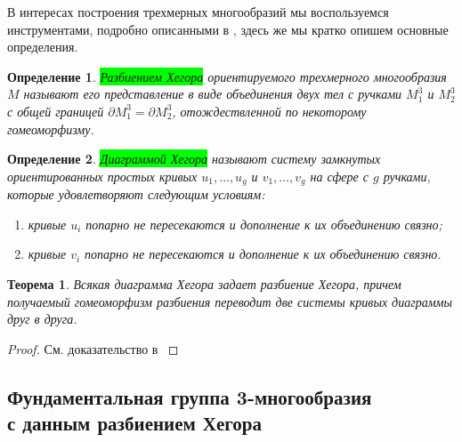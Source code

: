 \documentclass[a4paper, 12pt]{article}
\newtheorem*{theorem}{Теорема}
\newtheorem{definition}{Определение}
\begin{document}
        В интересах построения трехмерных многообразий мы воспользуемся инструментами, подробно описанными в \cite[Глава 4]{1997-hj}, здесь же мы кратко опишем основные определения. 

        \begin{definition}
            \colorbox{lime}{Разбиением Хегора} ориентируемого трехмерного многообразия $M$ называют его представление в виде объединения двух тел с ручками $M_1^3$ и $M_2^3$ с общей границей $\partial M_1^3 = \partial M_2^3$, отождествленной по некоторому гомеоморфизму.
        \end{definition}

        \begin{definition}
            \colorbox{lime}{Диаграммой Хегора} называют систему замкнутых ориентированных простых кривых $u_1, \dots, u_g$ и $v_1, \dots, v_g$ на сфере с $g$ ручками, которые удовлетворяют следующим условиям: 

            \begin{minipage}[t]{\linewidth}
                \begin{enumerate}[label=(\roman*)]
                    \item кривые $u_i$ попарно не пересекаются и дополнение к их объединению связно;
                    \item кривые $v_i$ попарно не пересекаются и дополнение к их объединению связно.
                \end{enumerate}
             \end{minipage}
        
        \end{definition}

        \begin{theorem}
            Всякая диаграмма Хегора задает разбиение Хегора, причем получаемый гомеоморфизм разбиения переводит две системы кривых диаграммы друг в друга.
        \end{theorem}

        \begin{proof}
            См. доказательство в \cite[Глава 4, \S 10.3]{1997-hj}
        \end{proof}

    \subsection{Фундаментальная группа 3-многообразия \\ с данным разбиением Хегора}
\end{document}
